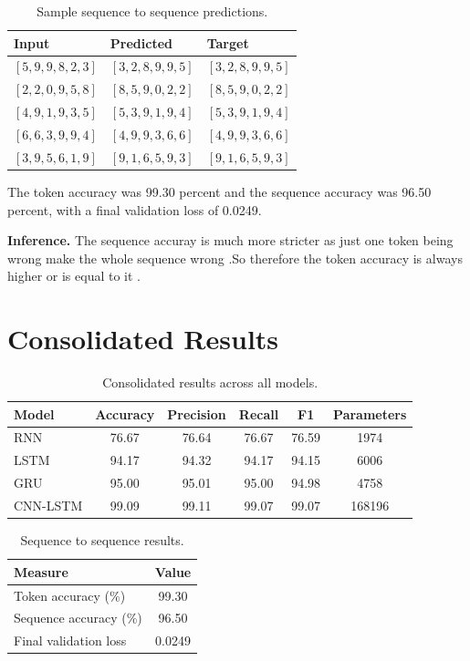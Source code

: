 \documentclass[12pt]{article}
\begin{document}
\begin{table}[H]
\centering
\caption{Sample sequence to sequence predictions.}
\begin{tabular}{@{}lll@{}}
\toprule
Input & Predicted & Target \\
\midrule
$[5, 9, 9, 8, 2, 3]$ & $[3, 2, 8, 9, 9, 5]$ & $[3, 2, 8, 9, 9, 5]$ \\
$[2, 2, 0, 9, 5, 8]$ & $[8, 5, 9, 0, 2, 2]$ & $[8, 5, 9, 0, 2, 2]$ \\
$[4, 9, 1, 9, 3, 5]$ & $[5, 3, 9, 1, 9, 4]$ & $[5, 3, 9, 1, 9, 4]$ \\
$[6, 6, 3, 9, 9, 4]$ & $[4, 9, 9, 3, 6, 6]$ & $[4, 9, 9, 3, 6, 6]$ \\
$[3, 9, 5, 6, 1, 9]$ & $[9, 1, 6, 5, 9, 3]$ & $[9, 1, 6, 5, 9, 3]$ \\
\bottomrule
\end{tabular}
\end{table}

The token accuracy was 99.30 percent and the sequence accuracy was 96.50 percent, with a final validation loss of 0.0249.

\noindent\textbf{Inference.}
The sequence accuray is much more stricter as just one  token being wrong  make the whole sequence wrong .So therefore the token accuracy is always higher or is equal to it .



\section{Consolidated Results}

\begin{table}[H]
\centering
\caption{Consolidated results across all models.}
\begin{tabular}{@{}lccccc@{}}
\toprule
Model & Accuracy & Precision & Recall & F1 & Parameters \\
\midrule
RNN & 76.67 & 76.64 & 76.67 & 76.59 & 1974 \\
LSTM & 94.17 & 94.32 & 94.17 & 94.15 & 6006 \\
GRU & 95.00 & 95.01 & 95.00 & 94.98 & 4758 \\
CNN-LSTM & 99.09 & 99.11 & 99.07 & 99.07 & 168196 \\
\bottomrule
\end{tabular}
\end{table}

\begin{table}[H]
\centering
\caption{Sequence to sequence results.}
\begin{tabular}{@{}lc@{}}
\toprule
Measure & Value \\
\midrule
Token accuracy (\%) & 99.30 \\
Sequence accuracy (\%) & 96.50 \\
Final validation loss & 0.0249 \\
\bottomrule
\end{tabular}
\end{table}
\end{document}
